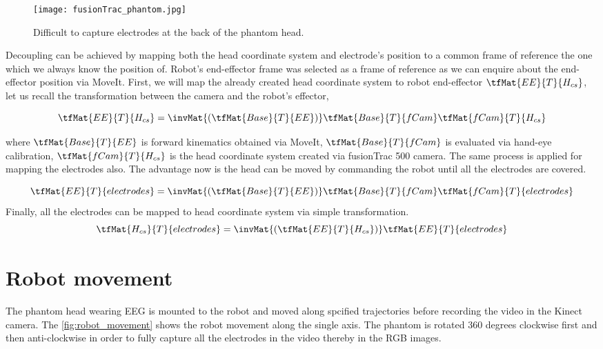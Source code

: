 \begin{figure}[hbt!]
	\centering
	\texttt{[image: fusionTrac\_phantom.jpg]}
	\caption{Difficult to capture electrodes at the back of the phantom head.} 
	\label{fig:fusionTrac_phantom}
\end{figure}

Decoupling can be achieved by mapping both the head coordinate system and electrode's position to a common frame of reference the one which we always know the position of. Robot's end-effector frame was selected as a frame of reference as we can enquire about the end-effector position via MoveIt. First, we will map the already created head coordinate system to robot end-effector $ \tfMat{EE}{T}{H_{cs}}$, let us recall the transformation between the camera and the robot's effector,

\begin{equation*}
\tfMat{EE}{T}{H_{cs}} = \invMat{(\tfMat{Base}{T}{EE})} \tfMat{Base}{T}{fCam} \tfMat{fCam}{T}{H_{cs}}
\end{equation*} 

where $\tfMat{Base}{T}{EE}$ is forward kinematics obtained via MoveIt, $\tfMat{Base}{T}{fCam}$ is evaluated via hand-eye calibration, $\tfMat{fCam}{T}{H_{cs}}$ is the head coordinate system created via fusionTrac 500 camera. The same process is applied for mapping the electrodes also. The advantage now is the head can be moved by commanding the robot until all the electrodes are covered.

\begin{equation*}
	\tfMat{EE}{T}{electrodes} = \invMat{(\tfMat{Base}{T}{EE})} \tfMat{Base}{T}{fCam} \tfMat{fCam}{T}{electrodes}
\end{equation*}  
Finally, all the electrodes can be mapped to head coordinate system via simple transformation.
\begin{equation*}
	\tfMat{H_{cs}}{T}{electrodes} = \invMat{(\tfMat{EE}{T}{H_{cs}})} \tfMat{EE}{T}{electrodes}
\end{equation*}

\section{Robot movement}
The phantom head wearing EEG is mounted to the robot and moved along spcified trajectories before recording the video in the Kinect camera. The \cref{fig:robot_movement} shows the robot movement along the single axis. The phantom is rotated 360 degrees clockwise first and then anti-clockwise in order to fully capture all the electrodes in the video thereby in the RGB images. 

